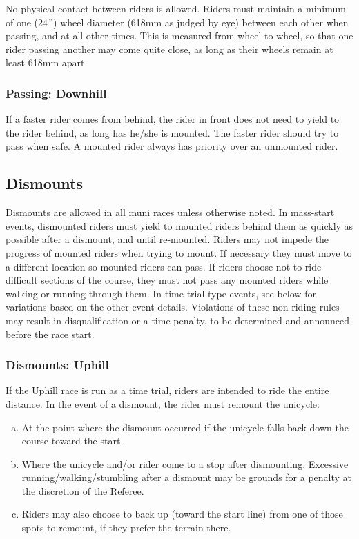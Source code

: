 No physical contact between riders is allowed.
Riders must maintain a minimum of one (24$"$) wheel diameter (618mm as judged by eye) between each other when passing, and at all other times.
This is measured from wheel to wheel, so that one rider passing another may come quite close, as long as their wheels remain at least 618mm apart.

\subsubsection{Passing: Downhill}

If a faster rider comes from behind, the rider in front does not need to yield to the rider behind, as long has he/she is mounted.
The faster rider should try to pass when safe. A mounted rider always has priority over an unmounted rider.

\subsection{Dismounts}
Dismounts are allowed in all muni races unless otherwise noted.
In mass-start events, dismounted riders must yield to mounted riders behind them as quickly as possible after a dismount, and until re-mounted.
Riders may not impede the progress of mounted riders when trying to mount.
If necessary they must move to a different location so mounted riders can pass.
If riders choose not to ride difficult sections of the course, they must not pass any mounted riders while walking or running through them.
In time trial-type events, see below for variations based on the other event details.
Violations of these non-riding rules may result in disqualification or a time penalty, to be determined and announced before the race start.

\subsubsection{Dismounts: Uphill}
If the Uphill race is run as a time trial, riders are intended to ride the entire distance.
In the event of a dismount, the rider must remount the unicycle:
\begin{enumerate}[(a)]
\item At the point where the dismount occurred if the unicycle falls back down the course toward the start.
\item Where the unicycle and/or rider come to a stop after dismounting.
Excessive running/walking/stumbling after a dismount may be grounds for a
penalty at the discretion of the Referee.
\item Riders may also choose to back up (toward the start line) from one of those spots to remount, if they prefer the terrain there.
\end{enumerate}

